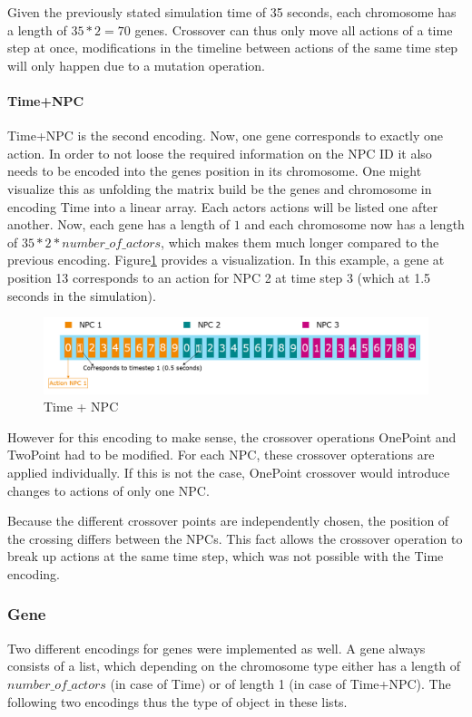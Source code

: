 Given the previously stated simulation time of 35 seconds, each chromosome has a length of $35 * 2 = 70$ genes.
Crossover can thus only move all actions of a time step at once, modifications in the timeline between actions of the same time step will only happen due to a mutation operation.

\paragraph{Time+NPC}
Time+NPC is the second encoding. Now, one gene corresponds to exactly one action. In order to not loose the required information on the NPC ID it also needs to be encoded into the genes position in its chromosome. One might visualize this as unfolding the matrix build be the genes and chromosome in encoding Time into a linear array. Each actors actions will be listed one after another. Now, each gene has a length of $1$ and each chromosome now has a length of $35 * 2 * number\_of\_actors$, which makes them much longer compared to the previous encoding. Figure\ref{figure:encoding:chromosome:time_npc} provides a visualization. In this example, a gene at position 13 corresponds to an action for NPC 2 at time step 3 (which at 1.5 seconds in the simulation).

\begin{figure}[ht] 
	\includegraphics[width=1\linewidth]{figures/time_npc_encoding}
	\caption{Time + NPC}
	\label{figure:encoding:chromosome:time_npc}
\end{figure}

However for this encoding to make sense, the crossover operations OnePoint and TwoPoint had to be modified. For each NPC, these crossover opterations are applied individually. If this is not the case, OnePoint crossover would introduce changes to actions of only one NPC.

Because the different crossover points are independently chosen, the position of the crossing differs between the NPCs. This fact allows the crossover operation to break up actions at the same time step, which was not possible with the Time encoding.

\subsubsection{Gene}
Two different encodings for genes were implemented as well. A gene always consists of a list, which depending on the chromosome type either has a length of $number\_of\_actors$ (in case of Time) or of length 1 (in case of Time+NPC). The following two encodings thus the type of object in these lists.

